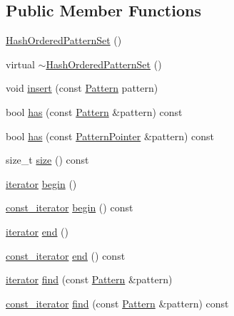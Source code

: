 \subsection*{Public Member Functions}
\begin{DoxyCompactItemize}
\item 
\hyperlink{classHashOrderedPatternSet_a045167c1a12c5e9e6dca775c2080a7b0}{Hash\+Ordered\+Pattern\+Set} ()
\item 
virtual \hyperlink{classHashOrderedPatternSet_acabae5fd5eb84ef383deb562a4cef808}{$\sim$\+Hash\+Ordered\+Pattern\+Set} ()
\item 
void \hyperlink{classHashOrderedPatternSet_a9da0aaf61e7b1425a181da16ccef6a1b}{insert} (const \hyperlink{classPattern}{Pattern} pattern)
\item 
bool \hyperlink{classHashOrderedPatternSet_ac21ec186302af16a3b70c5c85e434510}{has} (const \hyperlink{classPattern}{Pattern} \&pattern) const 
\item 
bool \hyperlink{classHashOrderedPatternSet_a4d917cedc8386b463aae0ad86856c82a}{has} (const \hyperlink{classPatternPointer}{Pattern\+Pointer} \&pattern) const 
\item 
size\+\_\+t \hyperlink{classHashOrderedPatternSet_a42fee5ee6f163edf807623ffc6ab2617}{size} () const 
\item 
\hyperlink{classHashOrderedPatternSet_a3191eb8aa122dfe2bf819d37468bd0b6}{iterator} \hyperlink{classHashOrderedPatternSet_a94bf915d870e33639c80839d7da7ce54}{begin} ()
\item 
\hyperlink{classHashOrderedPatternSet_a5e1bbb1c4ef5ee0937bc0d5251a8d97e}{const\+\_\+iterator} \hyperlink{classHashOrderedPatternSet_a82869ce8a41f6f5d45ffca4cd4f4133c}{begin} () const 
\item 
\hyperlink{classHashOrderedPatternSet_a3191eb8aa122dfe2bf819d37468bd0b6}{iterator} \hyperlink{classHashOrderedPatternSet_ada3bb2f1617443ad288c5c22dcd33ec0}{end} ()
\item 
\hyperlink{classHashOrderedPatternSet_a5e1bbb1c4ef5ee0937bc0d5251a8d97e}{const\+\_\+iterator} \hyperlink{classHashOrderedPatternSet_a0bd639de898189b047a8432292d18392}{end} () const 
\item 
\hyperlink{classHashOrderedPatternSet_a3191eb8aa122dfe2bf819d37468bd0b6}{iterator} \hyperlink{classHashOrderedPatternSet_aaf005777860a7af872aa104b1b7f9895}{find} (const \hyperlink{classPattern}{Pattern} \&pattern)
\item 
\hyperlink{classHashOrderedPatternSet_a5e1bbb1c4ef5ee0937bc0d5251a8d97e}{const\+\_\+iterator} \hyperlink{classHashOrderedPatternSet_a1c4db04fcfa32faf3f807f40bc52f602}{find} (const \hyperlink{classPattern}{Pattern} \&pattern) const 

\end{DoxyCompactItemize}
